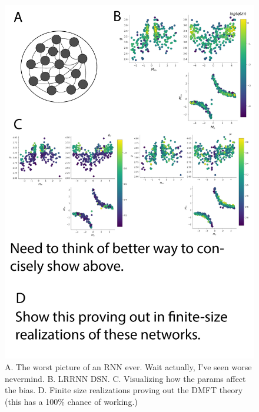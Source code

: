 \documentclass[11pt]{article}
\begin{document}
\begin{figure}
\begin{center}
\includegraphics[scale=0.4]{figs/fig5/fig5.pdf}
\end{center}
\caption{A. The worst picture of an RNN ever.  Wait actually, I've seen worse nevermind. B. LRRNN DSN.  C. Visualizing how the params affect the bias.  D. Finite size realizations proving out the DMFT theory (this has a 100\% chance of working.)}
\end{figure}
\end{document}

